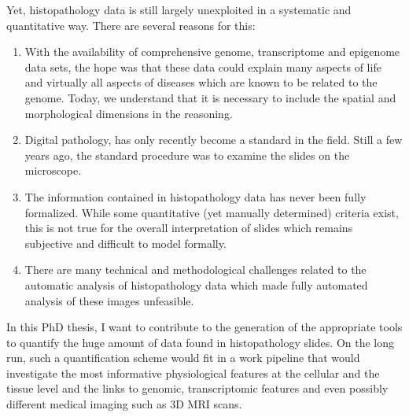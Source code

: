 \documentclass[a4paper,10pt]{article}
\begin{document}
Yet, histopathology data is still largely unexploited in a systematic and
quantitative way. There are several reasons for this: 
\begin{enumerate}
\item With the
availability of comprehensive genome, transcriptome and epigenome data
sets, the hope was that these data could explain many aspects of life
and virtually all aspects of diseases which are known to be related to
the genome. Today, we understand that it is necessary to include the spatial and
morphological dimensions in the reasoning. 
\item Digital pathology,
has only recently become a standard in the field. Still a few years
ago, the standard
procedure was to examine the slides on the
microscope. 
\item The information
contained in histopathology data has never been fully
formalized. While some quantitative (yet manually determined) criteria
exist, this is not true for the overall interpretation of slides
which remains subjective and difficult to model formally. 
\item There are many technical and methodological challenges related
  to the automatic analysis of histopathology data which made fully
  automated analysis of these images unfeasible. 
\end{enumerate}

%
%

In this PhD thesis, I want to contribute to the generation of the
appropriate tools to quantify the huge amount of data found in
histopathology slides. On the long run, such a
 quantification scheme would fit in a work pipeline that would
 investigate the most informative physiological features at the
 cellular and the tissue level and the links
 to genomic, transcriptomic features and even possibly different
 medical imaging such as 3D MRI scans. 
 
\end{document}
